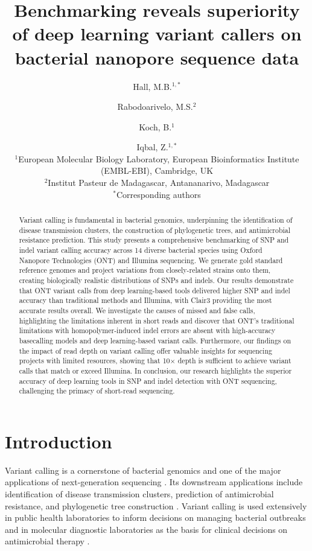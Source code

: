 \documentclass[11pt]{article}
\title{Benchmarking reveals superiority of deep learning variant callers on bacterial nanopore sequence data}
\author{
Hall, M.B.$^{1,*}$ \and Rabodoarivelo, M.S.$^{2}$ \and Koch, B.$^{1}$ \and Iqbal, Z.$^{1,*}$\\[6pt]
\small $^{1}$European Molecular Biology Laboratory, European Bioinformatics Institute (EMBL-EBI), Cambridge, UK\\
\small $^{2}$Institut Pasteur de Madagascar, Antananarivo, Madagascar\\
\small $^{*}$Corresponding authors
}
\date{}
\begin{document}
\maketitle

\begin{abstract}
Variant calling is fundamental in bacterial genomics, underpinning the identification of disease transmission clusters, the construction of phylogenetic trees, and antimicrobial resistance prediction. This study presents a comprehensive benchmarking of SNP and indel variant calling accuracy across 14 diverse bacterial species using Oxford Nanopore Technologies (ONT) and Illumina sequencing. We generate gold standard reference genomes and project variations from closely-related strains onto them, creating biologically realistic distributions of SNPs and indels. Our results demonstrate that ONT variant calls from deep learning-based tools delivered higher SNP and indel accuracy than traditional methods and Illumina, with Clair3 providing the most accurate results overall. We investigate the causes of missed and false calls, highlighting the limitations inherent in short reads and discover that ONT's traditional limitations with homopolymer-induced indel errors are absent with high-accuracy basecalling models and deep learning-based variant calls. Furthermore, our findings on the impact of read depth on variant calling offer valuable insights for sequencing projects with limited resources, showing that 10$\times$ depth is sufficient to achieve variant calls that match or exceed Illumina. In conclusion, our research highlights the superior accuracy of deep learning tools in SNP and indel detection with ONT sequencing, challenging the primacy of short-read sequencing.
\end{abstract}

\section{Introduction}

Variant calling is a cornerstone of bacterial genomics and one of the major applications of next-generation sequencing \citep{stimson2019, treangen2014}. Its downstream applications include identification of disease transmission clusters, prediction of antimicrobial resistance, and phylogenetic tree construction \citep{walker2022, meehan2021, hunt2023}. Variant calling is used extensively in public health laboratories to inform decisions on managing bacterial outbreaks and in molecular diagnostic laboratories as the basis for clinical decisions on antimicrobial therapy \citep{greig2019}.
\end{document}
